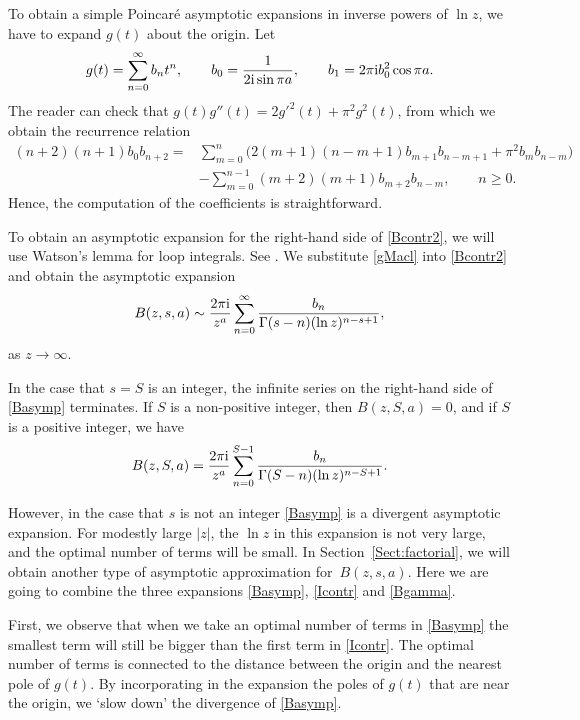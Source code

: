 \documentclass[pdftex]{sigma}
\numberwithin{equation}{section}
\def\iunit{{\rm i}}
\begin{document}
To obtain a simple Poincar\'e asymptotic expansions in inverse powers of $\ln z$,
we have to expand $g(t)$ about the origin. Let
\begin{gather}\label{gMacl}
 g(t)=\sum_{n=0}^\infty b_nt^n,\qquad b_0=\frac{1}{2\iunit\sin\pi a},\qquad
 b_1=2\pi\iunit b_0^2\cos\pi a.
\end{gather}
The reader can check that $g(t)g''(t)=2g'^2(t)+\pi^2g^2(t)$, from which we obtain the recurrence relation{\samepage
\begin{align*}%
 (n+2)(n+1)b_0b_{n+2}={}&\sum_{m=0}^n\big(2(m+1)(n-m+1)b_{m+1}b_{n-m+1}
 +\pi^2b_m b_{n-m}\big)\\
 &-\sum_{m=0}^{n-1}(m+2)(m+1)b_{m+2}b_{n-m},\qquad n\geq0.
\end{align*}
 Hence, the computation of the coefficients is straightforward.}

To obtain an asymptotic expansion for the right-hand side of \eqref{Bcontr2},
we will use Watson's lemma for loop integrals. See \cite[Section~4.5.3]{Olver1997}.
We substitute \eqref{gMacl} into \eqref{Bcontr2} and obtain the asymptotic expansion
\begin{equation}\label{Basymp}
 B(z,s,a)\sim \frac{2\pi\iunit}{z^{a}}\sum_{n=0}^\infty
 \frac{b_n}{\Gamma(s-n)(\ln z)^{n-s+1}},
\end{equation}
as $z\to\infty$.

In the case that $s=S$ is an integer, the infinite series on the right-hand side
of \eqref{Basymp} terminates.
If $S$ is a non-positive integer, then $B(z,S,a)=0$, and if $S$ is a positive integer,
we have
\begin{gather*}%
 B(z,S,a)= \frac{2\pi\iunit}{z^{a}}\sum_{n=0}^{S-1}
 \frac{b_n}{\Gamma(S-n)(\ln z)^{n-S+1}}.
\end{gather*}

However, in the case that $s$ is not an integer
\eqref{Basymp} is a divergent asymptotic expansion. For modestly large $|z|$, the $\ln z$ in
this expansion is not very large, and the optimal number of terms will be small.
In Section~\ref{Sect:factorial}, we will obtain another type of asymptotic approximation for~$B(z,s,a)$.
Here we are going to combine the three expansions \eqref{Basymp}, \eqref{Icontr} and \eqref{Bgamma}.

First, we observe that when we take an optimal number of terms in \eqref{Basymp} the smallest term will
still be bigger than the first term in \eqref{Icontr}. The optimal number of terms is connected to the
distance between the origin and the nearest pole of $g(t)$. By incorporating in the expansion
the poles of $g(t)$ that are near the origin, we `slow down' the divergence of \eqref{Basymp}.
\end{document}
